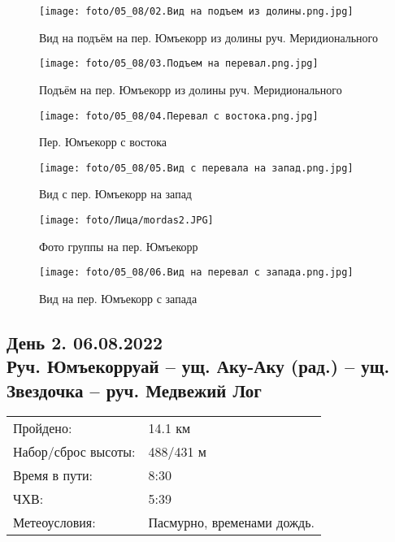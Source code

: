 \begin{figure}
    \centering
    \texttt{[image: foto/05\_08/02.Вид на подъем из долины.png.jpg]}
    \caption{Вид на подъём на пер. Юмъекорр из долины руч. Меридионального}
    \label{fig1:3}
\end{figure}

\begin{figure}
    \centering
    \texttt{[image: foto/05\_08/03.Подъем на перевал.png.jpg]}
    \caption{Подъём на пер. Юмъекорр из долины руч. Меридионального}
    \label{fig1:4}
\end{figure}

\begin{figure}
    \centering
    \texttt{[image: foto/05\_08/04.Перевал с востока.png.jpg]}
    \caption{Пер. Юмъекорр с востока}
    \label{fig1:5}
\end{figure}

\begin{figure}
    \centering
    \texttt{[image: foto/05\_08/05.Вид с перевала на запад.png.jpg]}
    \caption{Вид с пер. Юмъекорр на запад}
    \label{fig1:6}
\end{figure}

\begin{figure}
    \centering
    \texttt{[image: foto/Лица/mordas2.JPG]}
    \caption{Фото группы на пер. Юмъекорр}
    \label{fig1:7}
\end{figure}

\begin{figure}
    \centering
    \texttt{[image: foto/05\_08/06.Вид на перевал с запада.png.jpg]}
    \caption{Вид на пер. Юмъекорр с запада}
    \label{fig1:8}
\end{figure}

\FloatBarrier

\subsection{День 2. 06.08.2022\\
Руч. Юмъекорруай -- ущ. Аку-Аку (рад.) -- ущ. Звездочка -- руч. Медвежий Лог}
\begin{tabular}{l p{12cm}}
\hline
Пройдено: & 14.1 км\\
Набор/сброс высоты: & 488/431 м\\
Время в пути: & 8:30\\
ЧХВ: & 5:39\\
Метеоусловия: & Пасмурно, временами дождь.\\
\hline
\end{tabular}

